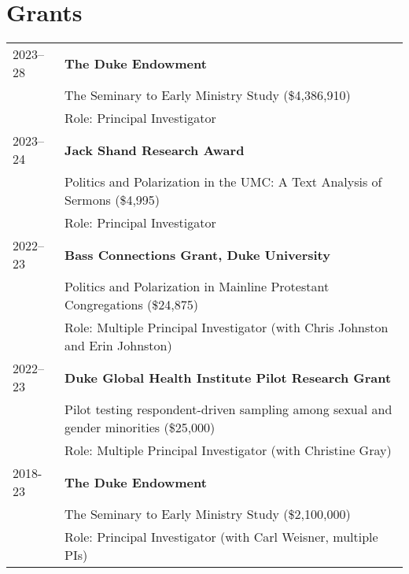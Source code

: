 
\section*{Grants}
\begin{longtable}{p{} p{}}
	
2023--28 & \textbf{The Duke Endowment}\\
& The Seminary to Early Ministry Study (\$4,386,910)\\
& Role: Principal Investigator\\

2023--24 & \textbf{Jack Shand Research Award}\\
& Politics and Polarization in the UMC: A Text Analysis of Sermons (\$4,995)\\
& Role: Principal Investigator\\

2022--23 & \textbf{Bass Connections Grant, Duke University}\\
& Politics and Polarization in Mainline Protestant Congregations (\$24,875)\\
& Role: Multiple Principal Investigator (with Chris Johnston and Erin Johnston)\\

2022--23 & \textbf{Duke Global Health Institute Pilot Research Grant}\\
& Pilot testing respondent-driven sampling among sexual and gender minorities (\$25,000)\\
& Role: Multiple Principal Investigator (with Christine Gray)\\

2018-23 & \textbf{The Duke Endowment}\\
& The Seminary to Early Ministry Study (\$2,100,000)\\
& Role: Principal Investigator (with Carl Weisner, multiple PIs)\\
%


\end{longtable}
